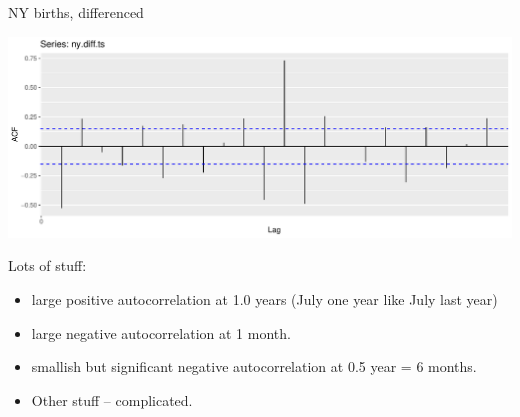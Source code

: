 \documentclass[
  ignorenonframetext,
]{beamer}
\newenvironment{Shaded}{\begin{snugshade}}{\end{snugshade}}
\newcommand{\DataTypeTok}[1]{\textcolor[rgb]{0.13,0.29,0.53}{#1}}
\newcommand{\KeywordTok}[1]{\textcolor[rgb]{0.13,0.29,0.53}{\textbf{#1}}}
\newcommand{\NormalTok}[1]{#1}
\newcommand{\OperatorTok}[1]{\textcolor[rgb]{0.81,0.36,0.00}{\textbf{#1}}}
\newcommand{\StringTok}[1]{\textcolor[rgb]{0.31,0.60,0.02}{#1}}
\providecommand{\tightlist}{%
  \setlength{\itemsep}{0pt}\setlength{\parskip}{0pt}}
\begin{document}
\begin{frame}[fragile]{NY births, differenced}
\protect\hypertarget{ny-births-differenced}{}

\begin{Shaded}
\end{Shaded}

\includegraphics{slides_d29_files/figure-beamer/unnamed-chunk-541-1.pdf}

\end{frame}

\begin{frame}{Lots of stuff:}
\protect\hypertarget{lots-of-stuff}{}

\begin{itemize}
\tightlist
\item
  large positive autocorrelation at 1.0 years (July one year like July
  last year)
\item
  large negative autocorrelation at 1 month.
\item
  smallish but significant negative autocorrelation at 0.5 year = 6
  months.
\item
  Other stuff -- complicated.
\end{itemize}

\end{frame}
\end{document}
